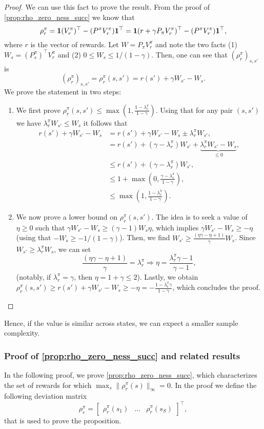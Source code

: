 \begin{proof}
We can use this fact to prove the result. From the proof of \cref{prop:rho_zero_ness_succ} we know that
 \[
\rho_r^\pi = {\bf 1}(V_r^\pi)^\top - (P^\pi V_r^\pi){\bf 1}^\top = {\bf 1}(r+\gamma P_\pi V_r^\pi)^\top - (P^\pi V_r^\pi){\bf 1}^\top,
\]
where $r$ is the vector of rewards.  Let $W= P_\pi V_r^\pi$ and note the two facts (1) $W_s  =(P_s^\pi)^\top V_r^\pi$  and (2) $0\leq W_s\leq 1/(1-\gamma)$. Then, one can see that $(\rho_r^\pi)_{s,s'}$ is
\[
(\rho_r^\pi)_{s,s'}=\rho_r^\pi(s,s')=r(s') + \gamma W_{s'} - W_s.
\]
We prove the statement in two steps:
\begin{enumerate}
    \item We first prove $\rho_r^\pi(s,s')\leq \max\left(1, \frac{1 -\lambda_r^\pi}{1-\gamma} \right)$. Using that for any pair $(s,s')$ we have $\lambda_r^\pi W_{s'} \leq W_s$ it follows that   
\begin{align*}r(s') + \gamma W_{s'} - W_s &=r(s') + \gamma W_{s'} - W_s \pm \lambda_r^\pi W_{s'},\\
&=r(s') + (\gamma-\lambda_r^\pi) W_{s'} + \underbrace{\lambda_r^\pi W_{s'}- W_s}_{\leq 0},\\
&\leq r(s') + (\gamma-\lambda_r^\pi) W_{s'},\\
&\leq 1+ \max\left(0,\frac{\gamma -\lambda_r^\pi}{1-\gamma}\right),\\
&\leq  \max\left(1, \frac{1 -\lambda_r^\pi}{1-\gamma} \right).
\end{align*}
\item We now  prove a lower bound on $\rho_r^\pi(s,s')$. The idea is to seek  a value of $\eta \geq 0$ such that $\gamma W_{s'} -W_s \geq (\gamma-1)W_s \eta$, which implies $\gamma W_{s'}-W_s\geq -\eta$ (using that $-W_s\geq -1/(1-\gamma)$). 
Then, we find 
$
W_{s'}  \geq \frac{(\eta \gamma-\eta +1)}{\gamma}W_s$. Since $W_{s'}\geq \lambda_r^\pi W_s$, we can set
\[
\frac{(\eta \gamma-\eta +1)}{\gamma} = \lambda_r^\pi \Rightarrow \eta=\frac{\lambda_r^\pi \gamma-1}{\gamma-1},
\]
(notably, if $\lambda_r^\pi=\gamma$, then $\eta = 1+\gamma \leq 2$).
Lastly, we obtain $ \rho_r^\pi(s,s') \geq r(s')+\gamma W_{s'}-W_s\geq -\eta=-\frac{1-\lambda_r^\pi \gamma}{1-\gamma}$, which concludes the proof.
\end{enumerate}


\end{proof}
Hence, if the value is similar across states, we can expect a smaller sample complexity.


\subsubsection{Proof of \cref{prop:rho_zero_ness_succ} and related results}
\label{app:prop:rho_zero_ness_succ}
In the following proof, we prove \cref{prop:rho_zero_ness_succ}, which characterizes the set of rewards for which $\max_s\|\rho_r^\pi(s)\|_\infty = 0$. In the proof we define the following deviation matrix
\begin{equation}
\rho_r^\pi = \begin{bmatrix} \rho_r^\pi(s_1)& \dots & \rho_r^\pi(s_S)\end{bmatrix}^\top,
\end{equation}
that is used to prove the proposition.

